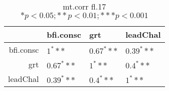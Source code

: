 \begin{table}[ht]
\centering
\begin{tabular}{rlll}
  \hline
 & bfi.consc & grt & leadChal \\ 
  \hline
bfi.consc & $1^***$ & $0.67^***$ & $0.39^***$ \\ 
  grt & $0.67^***$ & $1^***$ & $0.4^***$ \\ 
  leadChal & $0.39^***$ & $0.4^***$ & $1^***$ \\ 
   \hline
\end{tabular}
\caption{mt.corr fl.17 $* p < 0.05; ** p < 0.01; *** p < 0.001$} 
\end{table}

